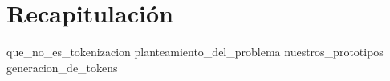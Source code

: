 %
%
%

\section{Recapitulación}

{que_no_es_tokenizacion}
{planteamiento_del_problema}
{nuestros_prototipos}
{generacion_de_tokens}

